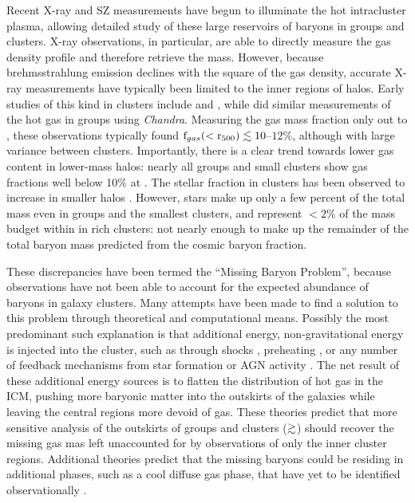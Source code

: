 Recent X-ray and SZ measurements have begun to illuminate the hot
intracluster plasma, allowing detailed study of these large reservoirs
of baryons in groups and clusters. X-ray observations, in particular,
are able to directly measure the gas density profile and therefore
retrieve the mass. However, because brehmsstrahlung emission declines
with the square of the gas density, accurate X-ray measurements have
typically been limited to the inner regions of halos. Early studies of
this kind in clusters include \citet[][with
  \textit{Chandra}]{Vikhlinin2006} and \citet[][with
  \textit{XMM-Newton}]{Arnaud2007}, while \citet{Sun2009} did similar
measurements of the hot gas in groups using
\textit{Chandra}. Measuring the gas mass fraction only out to
\rfive{}, these observations typically found
$\textrm{f\ensuremath{_{gas}}}{}(<\textrm{r\ensuremath{_{500}}}{}) \lesssim 10$--$12\%$, although with large
variance between clusters. Importantly, there is a clear trend towards
lower gas content in lower-mass halos: nearly all groups and small
clusters show gas fractions well below 10$\%{}$ at
\rfive{}.  The
stellar fraction in clusters has been observed to increase in smaller
halos \citep{Giodini2009, Bahcall2014}. However, stars make up only a
few percent of the total mass even in groups and the smallest
clusters, and represent $<2\%$ of the mass budget within \rfive{} in
rich clusters: not nearly enough to make up the remainder of the
total baryon mass predicted from the cosmic baryon fraction.

These discrepancies have been termed the ``Missing Baryon Problem'',
because observations have not been able to account for the expected
abundance of baryons in galaxy clusters. Many attempts have been made
to find a solution to this problem through theoretical and
computational means. Possibly the most predominant such explanation is
that additional energy, non-gravitational energy is injected into the
cluster, such as through shocks \citep{Takizawa1998}, preheating
\citep{Bialek2001}, or any number of feedback mechanisms from star
formation or AGN activity \citep{Metzler1994, McCarthy2007,
  Bode2009}. The net result of these additional energy sources is to
flatten the distribution of hot gas in the ICM, pushing more
baryonic matter into the outskirts of the galaxies while leaving the
central regions more devoid of gas. These theories predict that more
sensitive analysis of the outskirts of groups and clusters
($\gtrsim$\rvir{}) should recover the missing gas mas left unaccounted
for by observations of only the inner cluster regions. Additional
theories predict that the missing baryons could be residing in
additional phases, such as a cool diffuse gas phase, that have yet to
be identified observationally \citep{Afshordi2007, Bonamente2005}. 

